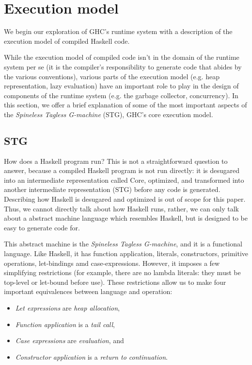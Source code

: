 \section{Execution model}

We begin our exploration of GHC's runtime system with a description
of the execution model of compiled Haskell code.

While the execution model of compiled code isn't in the domain of the
runtime system per se (it is the compiler's responsibility to generate
code that abides by the various conventions), various parts of the
execution model (e.g. heap representation, lazy evaluation) have an
important role to play in the design of components of the runtime system
(e.g. the garbage collector, concurrency).  In this section, we offer a
brief explanation of some of the most important aspects of the
\emph{Spineless Tagless G-machine} (STG), GHC's core execution model.

\subsection{STG}

How does a Haskell program run?  This is not a straightforward question
to answer, because a compiled Haskell program is not run directly: it is
desugared into an intermediate representation called Core, optimized,
and transformed into another intermediate representation (STG) before
any code is generated.  Describing how Haskell is desugared and
optimized is out of scope for this paper.  Thus, we cannot directly talk
about how Haskell runs, rather, we can only talk about a abstract
machine language which resembles Haskell, but is designed to be easy to
generate code for.

This abstract machine is the \emph{Spineless Tagless G-machine}, and it
is a functional language.  Like Haskell, it has function application,
literals, constructors, primitive operations, let-bindings amd
case-expressions.  However, it imposes a few simplifying restrictions
(for example, there are no lambda literals: they must be top-level or
let-bound before use).  These restrictions allow us to make four
important equivalences between language and operation:

\begin{itemize}
    \item \emph{Let expressions} are \emph{heap allocation},
    \item \emph{Function application} is a \emph{tail call},
    \item \emph{Case expressions} are \emph{evaluation}, and
    \item \emph{Constructor application} is a \emph{return to continuation}.
\end{itemize}

